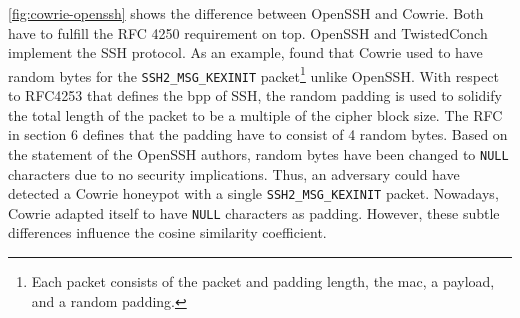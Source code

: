 \autoref{fig:cowrie-openssh} shows the difference between OpenSSH and Cowrie.
Both have to fulfill the RFC 4250 \cite{rfc4250} requirement on top.
OpenSSH and TwistedConch implement the SSH protocol.
As an example, \citet{vetterl2020} found that Cowrie used to have random bytes for the \verb|SSH2_MSG_KEXINIT| packet\footnote{Each packet consists of the packet and padding length, the \ac{mac}, a payload, and a random padding.} unlike OpenSSH.
With respect to RFC4253 \cite{rfc4253} that defines the \ac{bpp} of SSH, the random padding is used to solidify the total length of the packet to be a multiple of the cipher block size.
The RFC in section 6 defines that the padding have to consist of 4 random bytes.
Based on the statement of the OpenSSH authors, random bytes have been changed to \verb|NULL| characters due to no security implications.
Thus, an adversary could have detected a Cowrie honeypot with a single \verb|SSH2_MSG_KEXINIT| packet.
Nowadays, Cowrie adapted itself to have \verb|NULL| characters as padding.
However, these subtle differences influence the cosine similarity coefficient.

